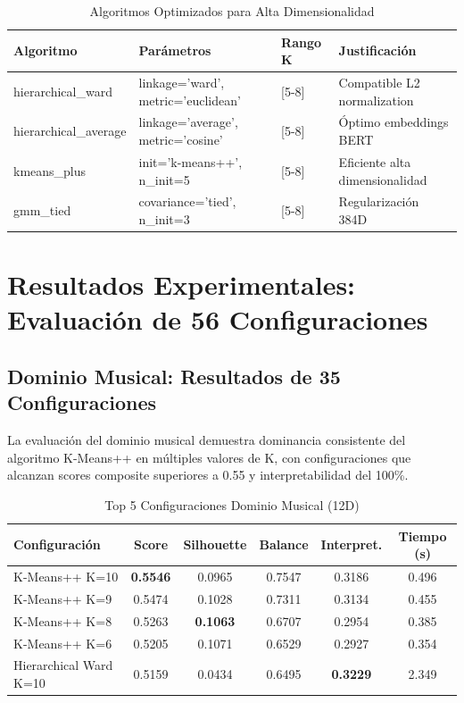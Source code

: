 \documentclass[12pt,a4paper]{report}
\begin{document}
\begin{table}[H]
\centering
\caption{Algoritmos Optimizados para Alta Dimensionalidad}
\begin{tabular}{|l|l|l|l|}
\hline
\textbf{Algoritmo} & \textbf{Parámetros} & \textbf{Rango K} & \textbf{Justificación} \\
\hline
hierarchical\_ward & linkage='ward', metric='euclidean' & [5-8] & Compatible L2 normalization \\
\hline
hierarchical\_average & linkage='average', metric='cosine' & [5-8] & Óptimo embeddings BERT \\
\hline
kmeans\_plus & init='k-means++', n\_init=5 & [5-8] & Eficiente alta dimensionalidad \\
\hline
gmm\_tied & covariance='tied', n\_init=3 & [5-8] & Regularización 384D \\
\hline
\end{tabular}
\end{table}

\section{Resultados Experimentales: Evaluación de 56 Configuraciones}

\subsection{Dominio Musical: Resultados de 35 Configuraciones}

La evaluación del dominio musical demuestra dominancia consistente del algoritmo K-Means++ en múltiples valores de K, con configuraciones que alcanzan scores composite superiores a 0.55 y interpretabilidad del 100\%.

\begin{table}[H]
\centering
\caption{Top 5 Configuraciones Dominio Musical (12D)}
\begin{tabular}{|l|c|c|c|c|c|}
\hline
\textbf{Configuración} & \textbf{Score} & \textbf{Silhouette} & \textbf{Balance} & \textbf{Interpret.} & \textbf{Tiempo (s)} \\
\hline
K-Means++ K=10 & \textbf{0.5546} & 0.0965 & 0.7547 & 0.3186 & 0.496 \\
\hline
K-Means++ K=9 & 0.5474 & 0.1028 & 0.7311 & 0.3134 & 0.455 \\
\hline
K-Means++ K=8 & 0.5263 & \textbf{0.1063} & 0.6707 & 0.2954 & 0.385 \\
\hline
K-Means++ K=6 & 0.5205 & 0.1071 & 0.6529 & 0.2927 & 0.354 \\
\hline
Hierarchical Ward K=10 & 0.5159 & 0.0434 & 0.6495 & \textbf{0.3229} & 2.349 \\
\hline
\end{tabular}
\end{table}
\end{document}
